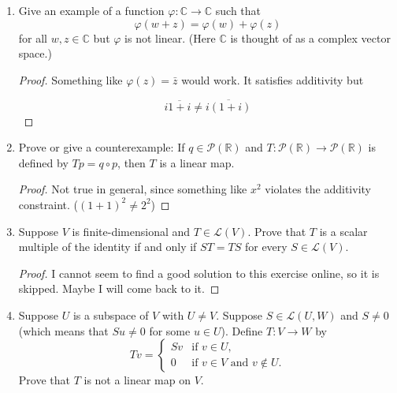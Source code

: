 \begin{enumerate}
\begin{proof}
    Maybe something like 

    $$f(a, b) = \begin{cases}
        a & a=b \\
        0 & a \neq b
    \end{cases}$$ 

    would work.
\end{proof}

\item[9] Give an example of a function $\varphi\colon \mathbb{C} \to \mathbb{C}$ such that
\[
\varphi(w+z)=\varphi(w)+\varphi(z)
\]
for all $w,z\in\mathbb{C}$ but $\varphi$ is not linear. (Here $\mathbb{C}$ is thought
of as a complex vector space.)

\begin{proof}
    Something like $\varphi(z) = \bar{z}$ would work. It satisfies additivity but 

    $$i\overline{1 + i} \neq \overline{i(1 + i)}$$
\end{proof}

\item[10] Prove or give a counterexample: If $q \in \mathcal{P}(\mathbb{R})$ and $T \colon \mathcal{P}(\mathbb{R}) \to \mathcal{P}(\mathbb{R})$ is
defined by $Tp = q \circ p$, then $T$ is a linear map.

\begin{proof}
    Not true in general, since something like $x^2$ violates the additivity constraint. ($(1 + 1)^2 \neq 2^2$)
\end{proof}


\item[11] Suppose $V$ is finite-dimensional and $T \in \mathcal L(V)$. Prove that $T$ is a scalar
multiple of the identity if and only if $ST = TS$ for every $S \in \mathcal L(V)$.

\begin{proof}
    I cannot seem to find a good solution to this exercise online, so it is skipped. Maybe I will come back to it.
\end{proof}

\item[12] Suppose $U$ is a subspace of $V$ with $U \neq V$. Suppose $S \in \mathcal{L}(U, W)$ and
$S \neq 0$ (which means that $Su \neq 0$ for some $u \in U$). Define $T \colon V \to W$ by
\[
Tv=
\begin{cases}
Sv & \text{if } v \in U,\\
0 & \text{if } v \in V \text{ and } v \notin U.
\end{cases}
\]
Prove that $T$ is not a linear map on $V$.


\end{enumerate}
